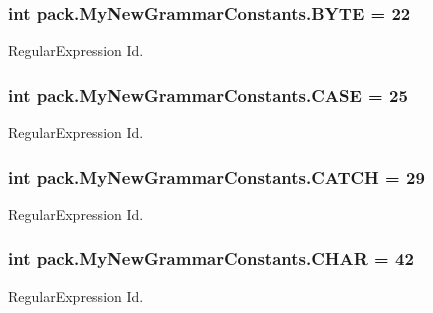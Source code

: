 \subsubsection[{\texorpdfstring{B\+Y\+TE}{BYTE}}]{\setlength{\rightskip}{0pt plus 5cm}int pack.\+My\+New\+Grammar\+Constants.\+B\+Y\+TE = 22}\hypertarget{interfacepack_1_1_my_new_grammar_constants_ad081b285723f6e9e185dc7cedeafd196}{}\label{interfacepack_1_1_my_new_grammar_constants_ad081b285723f6e9e185dc7cedeafd196}
Regular\+Expression Id. 
\subsubsection[{\texorpdfstring{C\+A\+SE}{CASE}}]{\setlength{\rightskip}{0pt plus 5cm}int pack.\+My\+New\+Grammar\+Constants.\+C\+A\+SE = 25}\hypertarget{interfacepack_1_1_my_new_grammar_constants_ae1ef5b168499be90863ee1505c516146}{}\label{interfacepack_1_1_my_new_grammar_constants_ae1ef5b168499be90863ee1505c516146}
Regular\+Expression Id. 
\subsubsection[{\texorpdfstring{C\+A\+T\+CH}{CATCH}}]{\setlength{\rightskip}{0pt plus 5cm}int pack.\+My\+New\+Grammar\+Constants.\+C\+A\+T\+CH = 29}\hypertarget{interfacepack_1_1_my_new_grammar_constants_a7702250f29f78049dfda62ef244dc865}{}\label{interfacepack_1_1_my_new_grammar_constants_a7702250f29f78049dfda62ef244dc865}
Regular\+Expression Id. 
\subsubsection[{\texorpdfstring{C\+H\+AR}{CHAR}}]{\setlength{\rightskip}{0pt plus 5cm}int pack.\+My\+New\+Grammar\+Constants.\+C\+H\+AR = 42}\hypertarget{interfacepack_1_1_my_new_grammar_constants_a7b702a1804c6666d732b97c7f3f9a155}{}\label{interfacepack_1_1_my_new_grammar_constants_a7b702a1804c6666d732b97c7f3f9a155}
Regular\+Expression Id. 
